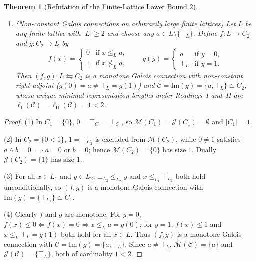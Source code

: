 \documentclass[11pt,a4paper]{article}
\newtheorem{theorem}{Theorem}[section]
\theoremstyle{definition}
\theoremstyle{remark}
\begin{document}
\begin{theorem}[Refutation of the Finite-Lattice Lower Bound $2$]
\begin{enumerate}
\item \emph{(Non-constant Galois connections on arbitrarily large finite lattices)} Let $L$ be \emph{any} finite lattice with $|L| \ge 2$ and choose any $a \in L \setminus \{\top_L\}$. Define $f : L \to C_2$ and $g : C_2 \to L$ by
\[
f(x) = \begin{cases} 0 & \text{if } x \le_L a,\\ 1 & \text{if } x \not\le_L a, \end{cases}
\qquad
g(y) = \begin{cases} a & \text{if } y = 0,\\ \top_L & \text{if } y = 1. \end{cases}
\]
Then $(f, g) : L \leftrightarrows C_2$ is a monotone Galois connection with non-constant right adjoint ($g(0) = a \neq \top_L = g(1)$) and $\mathcal{C} = \mathrm{Im}(g) = \{a, \top_L\} \cong C_2$, whose unique minimal representation lengths under Readings~I and~II are $\ell_{\mathrm{I}}(\mathcal{C}) = \ell_{\mathrm{II}}(\mathcal{C}) = 1 < 2$.
\end{enumerate}
\end{theorem}

\begin{proof}
(1) In $C_1 = \{0\}$, $0 = \top_{C_1} = \bot_{C_1}$, so $\mathcal{M}(C_1) = \mathcal{J}(C_1) = \emptyset$ and $|C_1| = 1$.

(2) In $C_2 = \{0 < 1\}$, $1 = \top_{C_2}$ is excluded from $\mathcal{M}(C_2)$, while $0 \neq 1$ satisfies $a \wedge b = 0 \implies a = 0 \text{ or } b = 0$; hence $\mathcal{M}(C_2) = \{0\}$ has size $1$. Dually $\mathcal{J}(C_2) = \{1\}$ has size $1$.

(3) For all $x \in L_1$ and $y \in L_2$, $\bot_{L_2} \le_{L_2} y$ and $x \le_{L_1} \top_{L_1}$ both hold unconditionally, so $(f, g)$ is a monotone Galois connection with $\mathrm{Im}(g) = \{\top_{L_1}\} \cong C_1$.

(4) Clearly $f$ and $g$ are monotone. For $y = 0$, $f(x) \le 0 \iff f(x) = 0 \iff x \le_L a = g(0)$; for $y = 1$, $f(x) \le 1$ and $x \le_L \top_L = g(1)$ both hold for all $x \in L$. Thus $(f, g)$ is a monotone Galois connection with $\mathcal{C} = \mathrm{Im}(g) = \{a, \top_L\}$. Since $a \neq \top_L$, $\mathcal{M}(\mathcal{C}) = \{a\}$ and $\mathcal{J}(\mathcal{C}) = \{\top_L\}$, both of cardinality $1 < 2$.
\end{proof}
\end{document}
